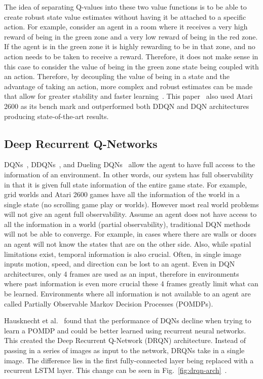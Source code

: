 \documentclass[12pt,american]{report}
\begin{document}
The idea of separating Q-values into these two value functions is to be able to create robust state value estimates without having it be attached to a specific action.  For example, consider an agent in a room where it receives a very high reward of being in the green zone and a very low reward of being in the red zone. If the agent is in the green zone it is highly rewarding to be in that zone, and no action needs to be taken to receive a reward. Therefore, it does not make sense in this case to consider the value of being in the green zone state being coupled with an action. Therefore, by decoupling the value of being in a state and the advantage of taking an action, more complex and robust estimates can be made that allow for greater stability and faster learning~\cite{wang2015dueling}. This paper~\cite{wang2015dueling} also used Atari 2600 as its bench mark and outperformed both DDQN and DQN architectures producing state-of-the-art results. 

\subsection{Deep Recurrent Q-Networks}
\label{sec:drqn}
DQNs~\cite{atari}, DDQNs~\cite{van2016deep}, and Dueling DQNs~\cite{wang2015dueling} allow the agent to have full access to the information of an environment. In other words, our system has full observability in that it is given full state information of the entire game state.  For example, grid worlds and Atari 2600 games have all the information of the world in a single state (no scrolling game play or worlds). However most real world problems will not give an agent full observability. Assume an agent does not have access to all the information in a world (partial observability), traditional DQN methods will not be able to converge. For example, in cases where there are walls or doors an agent will not know the states that are on the other side. Also, while spatial limitations exist, temporal information is also crucial.  Often, in single image inputs motion, speed, and direction can be lost to an agent. Even in DQN architectures, only 4 frames are used as an input, therefore in environments where past information is even more crucial these 4 frames greatly limit what can be learned. Environments where all information is not available to an agent are called Partially Observable Markov Decision Processes (POMDPs).  

Hausknecht et al.~\cite{HausknechtDRQN} found that the performance of DQNs decline when trying to learn a POMDP and could be better learned using recurrent neural networks. This created the Deep Recurrent Q-Network (DRQN) architecture. Instead of passing in a series of images as input to the network, DRQNs take in a single image. The difference lies in the first fully-connected layer being replaced with a recurrent LSTM layer. This change can be seen in Fig.~\ref{fig:drqn-arch}~\cite{HausknechtDRQN}.
\end{document}
